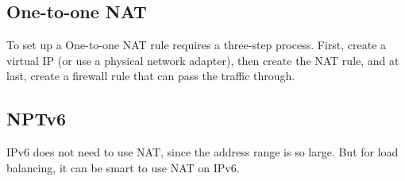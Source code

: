 
\subsection{One-to-one NAT} \label{one-to-one}
To set up a One-to-one NAT rule requires a three-step process. First, create a virtual IP (or use a physical network adapter), then create the NAT rule, and at last, create a firewall rule that can pass the traffic through.

\subsection{NPTv6} \label{nptv6}
IPv6 does not need to use NAT, since the address range is so large. But for load balancing, it can be smart to use NAT on IPv6.